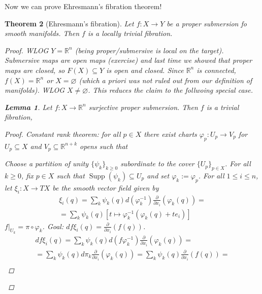\documentclass[12pt]{article}
\theoremstyle{darkgreentheorem}
\newtheorem{thm}{Theorem}[section]
\newtheorem{lm}[thm]{Lemma}
\theoremstyle{darkbluedefinition}
\theoremstyle{darkredexample}
\theoremstyle{remark}
\newcommand{\R}{\mathbb{R}}
\newcommand{\1}{\mathbbm{1}}
\DeclareMathOperator{\Supp}{Supp}
\newcommand{\sub}{\subseteq}
\begin{document}
Now we can prove Ehresmann's fibration theorem!

\begin{thm}[Ehresmann's fibration]
    Let $f\colon X\to Y$ be a proper submersion fo smooth manifolds.
    Then $f$ is a locally trivial fibration.
    \begin{proof}
	WLOG $Y=\R^{n}$ (being proper/submersive is local on the target).
	Submersive maps are open maps (exercise) and last time we showed that proper maps are closed, so $F(X)\sub Y$ is open and closed.
	Since $\R^{n}$ is connected, $f(X)=\R^{n}$ or $X=\varnothing$ (which a priori was not ruled out from our definition of manifolds).
	WLOG $X\neq\varnothing$.
	This reduces the claim to the follwoing special case.
	\begin{lm}
	    Let $f\colon X\to \R^{n}$ surjective proper submersion.
	    Then $f$ is a trivial fibration,
	    \begin{proof}
		Constant rank theorem: for all $p\in X$ there exist charts $\varphi_{p}\colon U_{p}\to V_{p}$ for $U_{p}\sub X$ and $V_{p}\sub \R^{n+k}$ opens such that
		\begin{center}
		\end{center}
		Choose a partition of unity $\{\psi_{k}\}_{k\geqslant 0}$ subordinate to the cover $\{U_{p}\}_{p\in X}$.
		For all $k\geqslant 0$, fix $p\in X$ such that $\Supp(\psi_{k})\sub U_{p}$ and set $\varphi_{k}:=\varphi_{p}$.
		For all $1\leqslant i\leqslant n$, let $\xi_{i}\colon X\to TX$ be the smooth vector field given by
		\begin{multline*}
		    \xi_{i}(q)=\sum_{k}\psi_{k}(q)d(\varphi_{k}^{-1})\frac{\partial}{\partial x_{i}}(\varphi_{k}(q)) =\\
		    = \sum_{k}\psi_{k}(q)[t\mapsto \varphi^{-1}_{k}(\varphi_{k}(q)+te_{i}) ]
		\end{multline*}
		$f|_{U_{k}}=\pi\circ \varphi_{k}$.
		Goal: $df\xi_{i}(q)=\frac{\partial }{\partial x_{i}}(f(q))$.
		\begin{multline*}
		    df\xi_{i}(q)=\sum_{k}\psi_{k}(q)d(f\varphi_{k}^{-1})\frac{\partial }{\partial x_{i}}(\varphi_{k}(q)) =\\
		    =\sum_{k} \psi_{k}(q)d\pi_{k}\frac{\partial }{\partial x_{i}}(\varphi_{k}(q))=\sum_{k}\psi_{k}(q)\frac{\partial}{\partial x_{i}}(f(q)) =\\

\end{multline*}
\end{proof}
\end{lm}
\end{proof}
\end{thm}
\end{document}
